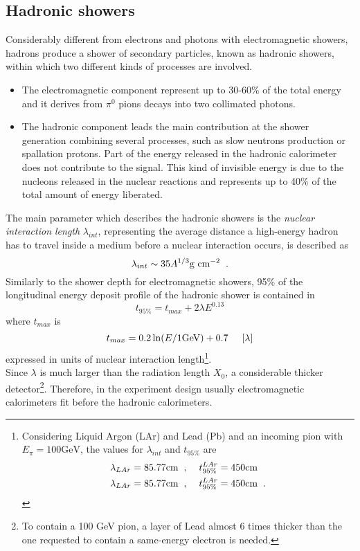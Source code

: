 \subsection{Hadronic showers}
Considerably different from electrons and photons with electromagnetic showers, hadrons produce a shower of secondary particles, known as hadronic showers, within which two different kinds of processes are involved.
\begin{itemize}
\item The electromagnetic component represent up to 30-60\% of the total energy and it derives from $\pi^0$ pions decays into two collimated photons.
\item The hadronic component leads the main contribution at the shower generation combining several processes, such as slow neutrons production or spallation protons. Part of the energy released in the hadronic calorimeter does not contribute to the signal. This kind of invisible energy is due to the nucleons released in the nuclear reactions and represents up to 40\% of the total amount of energy liberated.
\end{itemize}
The main parameter which describes the hadronic showers is the \emph{nuclear interaction length} $\lambda_{int}$, representing the average distance a high-energy hadron has to travel inside a medium before a nuclear interaction occurs, is described as
\begin{equation}
\lambda_{int} \sim 35 A^{1/3} \text{g cm}^{-2} \hspace{0.2cm} \text{.}
\end{equation}
Similarly to the shower depth for electromagnetic showers, 95\% of the longitudinal energy deposit profile of the hadronic shower is contained in
\begin{equation}
t_{95\%} = t_{max} + 2\lambda E^{0.13}
\end{equation}
where $t_{max}$ is
\begin{equation}
t_{max} = 0.2\ln(E/1 \text{GeV}) + 0.7 \hspace{0.5cm} [\lambda]
\end{equation}
expressed in units of nuclear interaction length\footnote{Considering Liquid Argon (LAr) and Lead (Pb) and an incoming pion with $E_{\pi} = 100 \text{GeV}$, the values for $\lambda_{int}$ and $t_{95\%}$ are
\begin{align*}
\lambda_{LAr} = 85.77 \text{cm} \hspace{0.2cm} &, \hspace{0.4cm} t_{95\%}^{LAr} = 450 \text{cm} \\
\lambda_{LAr} = 85.77 \text{cm} \hspace{0.2cm} &, \hspace{0.4cm} t_{95\%}^{LAr} = 450 \text{cm} \hspace{0.2cm} \text{.}
\end{align*}}.
\\
Since $\lambda$ is much larger than the radiation length $X_0$, a considerable thicker detector\footnote{To contain a 100 GeV pion, a layer of Lead almost 6 times thicker than the one requested to contain a same-energy electron is needed.}. Therefore, in the experiment design usually electromagnetic calorimeters fit before the hadronic calorimeters.

